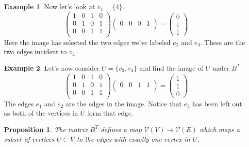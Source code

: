 \documentclass[10pt, letterpaper]{article}
\newtheorem{prop}{Proposition}
\theoremstyle{remark}
\theoremstyle{definition}
\newtheorem{ex}{Example}
\begin{document}
\begin{ex}
	Now let's look at $v_4 = \{4\}$.
	\[
		\begin{pmatrix}
			1 & 0 & 1 & 0 \\
			0 & 1 & 0 & 1 \\
			0 & 0 & 1 & 1 \\
		\end{pmatrix}
		\begin{pmatrix}
			0 & 0 & 0 & 1 \\
		\end{pmatrix} = 
		\begin{pmatrix}
			0 \\ 1 \\ 1 
		\end{pmatrix}
	\]
	Here the image has selected the two edges we've labeled $e_2 \text{ and } e_3$. These are the two edges incident to $v_4$.
\end{ex}

\begin{ex}
	Let's now consider $U = \{v_3,v_4\}$ and find the image of $U$ under $B^T$
	\[
		\begin{pmatrix}
			1 & 0 & 1 & 0 \\
			0 & 1 & 0 & 1 \\
			0 & 0 & 1 & 1 \\
		\end{pmatrix}
		\begin{pmatrix}
			0 & 0 & 1 & 1 \\
		\end{pmatrix} = 
		\begin{pmatrix}
			1 \\ 1 \\ 0 
		\end{pmatrix}
	\]
	The edges $e_1$ and $e_2$ are the edges in the image. Notice that $e_3$ has been left out as both of the vertices in $U$ form that edge.
\end{ex}

\begin{prop}
	The matrix $B^T$ defines a map $\mathcal{V}(V) \rightarrow \mathcal{V}(E)$ which maps a subset of vertices $U \subset V$ to the edges with exactly one vertex in $U$.
\end{prop}
\end{document}

